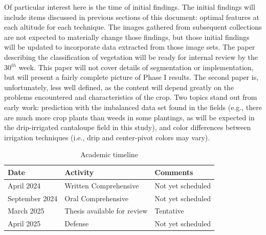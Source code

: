 \documentclass[12pt]{article}
\begin{document}
Of particular interest here is the time of initial findings. The initial findings will include items discussed in previous sections of this document: optimal features at each altitude for each technique. The images gathered from subsequent collections are not expected to materially change those findings, but those initial findings will be updated to incorporate data extracted from those image sets. The paper describing the classification of vegetation will be ready for internal review by the 30$^{th}$ week. This paper will not cover details of segmentation or implementation, but will present a fairly complete picture of Phase I results. The second paper is, unfortunately, less well defined, as the content will depend greatly on the problems encountered and characteristics of the crop. Two topics stand out from early work: prediction with the imbalanced data set found in the fields (e.g., there are much more crop plants than weeds in some plantings, as will be expected in the drip-irrigated cantaloupe field in this study), and color differences between irrigation techniques (i.e., drip and center-pivot colors may vary).

\begin{table}[ht]
	\centering
    \caption{Academic timeline}
    \label{tab:timeline}
    \begin{tabular}[t]{lll} 
		\textbf{Date} & \textbf{Activity} &\textbf{Comments}\\
		\midrule
			April 2024 & Written Comprehensive & Not yet scheduled\\
			September 2024 & Oral Comprehensive & Not yet scheduled\\
			March 2025 & Thesis available for review & Tentative\\
			April 2025 & Defense & Not yet scheduled\\

    \end{tabular}
\end{table}

 \newpage
%
%
\end{document}
